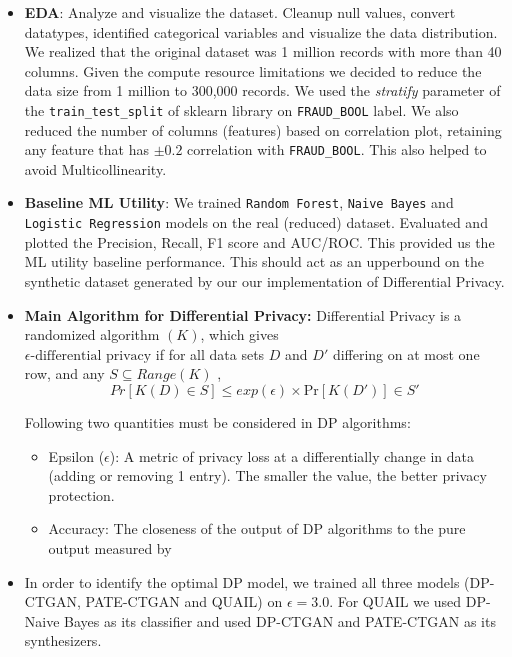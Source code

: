 \documentclass[10pt,twocolumn,letterpaper]{article}
\begin{document}
\begin{itemize}
    \item \textbf{EDA}\label{sec:Approach_EDA}: Analyze and visualize the dataset. Cleanup null values, convert datatypes, identified categorical variables and visualize the data distribution. We realized that the original dataset was 1 million records with more than 40 columns. Given the compute resource limitations we decided to reduce the data size from 1 million to 300,000 records. We used the \textit{stratify} parameter of the \verb'train_test_split' of sklearn library on \verb'FRAUD_BOOL' label. We also reduced the number of columns (features) based on correlation plot, retaining any feature that has $\pm0.2$ correlation with \verb'FRAUD_BOOL'. This also helped to avoid Multicollinearity.

    \item \textbf{Baseline ML Utility}: We trained \verb'Random Forest', \verb'Naive Bayes' and \verb'Logistic Regression' models on the real (reduced) dataset. Evaluated and plotted the Precision, Recall, F1 score and AUC/ROC. This provided us the ML utility baseline performance. This should act as an upperbound on the synthetic dataset generated by our our implementation of Differential Privacy.

    \item \textbf{Main Algorithm for Differential Privacy:}
    Differential Privacy is a randomized algorithm $(K)$, which gives \\$\epsilon\text{-differential \ privacy}$ if for all data sets $D$ and $D'$ differing on at most one row, and any $S \subseteq Range(K)$ , \cite{4} $$Pr[K(D) \in S] \leq exp(\epsilon) \times \text{Pr}[K(D')] \in S'$$

        Following two quantities must be considered in DP algorithms:
        \begin{itemize}
            \item Epsilon ($\epsilon$): A metric of privacy loss at a differentially change in data (adding or removing 1 entry). The smaller the value, the better privacy protection.

            \item Accuracy: The closeness of the output of DP algorithms to the pure output measured by  \cite{5}

        \end{itemize}

    \item In order to identify the optimal DP model, we trained all three models (DP-CTGAN, PATE-CTGAN and QUAIL) on $\epsilon=3.0$. For QUAIL we used DP-Naive Bayes as its classifier and used DP-CTGAN and PATE-CTGAN as its synthesizers.


\end{itemize}
\end{document}

